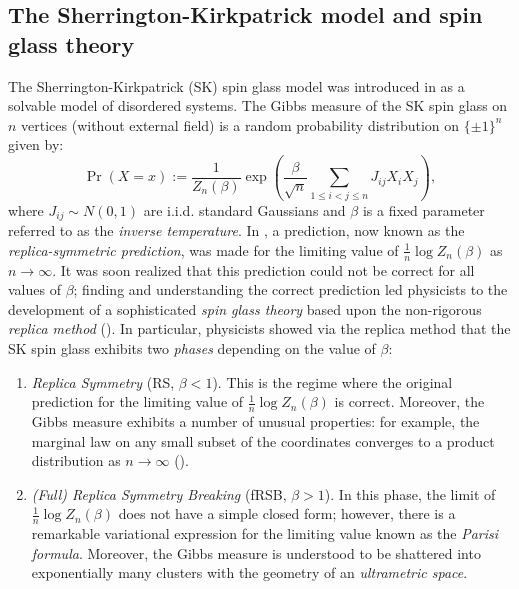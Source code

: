 \documentclass[11pt, oneside, english]{article}
\theoremstyle{definition}
\theoremstyle{plain}
\begin{document}
\subsection{The Sherrington-Kirkpatrick model and spin glass theory}
The Sherrington-Kirkpatrick (SK) spin glass model was introduced in \cite{kirkpatrick1975solvable} as a solvable model of disordered systems. The Gibbs measure of the SK spin glass on $n$ vertices (without external field) is a random probability distribution on $\{\pm 1\}^{n}$ given by:
\[ \Pr(X = x) := \frac{1}{Z_{n}(\beta)}\exp\left(\frac{\beta}{\sqrt{n}}\sum_{1 \le i < j \le n} J_{ij} X_i X_j\right),\]
where $J_{ij} \sim N(0,1)$ are i.i.d. standard Gaussians and $\beta$ is a fixed parameter referred to as the \emph{inverse temperature}.
In \cite{kirkpatrick1975solvable}, a prediction, now known as the \emph{replica-symmetric prediction}, was made for the limiting value of $\frac{1}{n} \log Z_n(\beta)$ as $n \to \infty$.
It was soon realized that this prediction could not be correct for all values of $\beta$; finding and understanding the correct prediction led physicists to the development of a sophisticated \emph{spin glass theory} based upon the non-rigorous \emph{replica method} (\cite{mezard1987spin}). In particular, physicists showed via the replica method that the SK spin glass exhibits two \emph{phases} depending on the value of $\beta$:
\begin{enumerate}
\item \emph{Replica Symmetry} (RS, $\beta < 1$). This is the regime where the original prediction for the limiting value of $\frac{1}{n} \log Z_{n}(\beta)$ is correct. Moreover, the Gibbs measure exhibits a number of unusual properties: for example, the marginal law on any small subset of the coordinates converges to a product distribution as $n \to \infty$ (\cite{Talagrand:11}). %
\item \emph{(Full) Replica Symmetry Breaking} (fRSB, $\beta > 1$). In this phase, the limit of $\frac{1}{n} \log Z_n(\beta)$ does not have a simple closed form; however, there is a remarkable variational expression for the limiting value known as the \emph{Parisi formula}. Moreover, the Gibbs measure is understood to be shattered into exponentially many clusters with the geometry of an \emph{ultrametric space}. %
\end{enumerate} 
\end{document}
